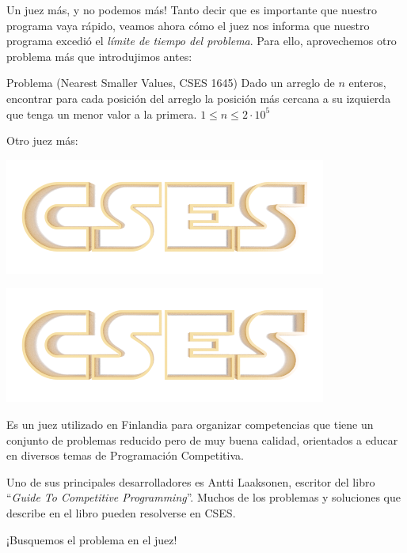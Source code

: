 \documentclass{beamer}
\begin{document}
    \begin{frame}{Un juez más, y no podemos más!}
        Tanto decir que es importante que nuestro programa vaya rápido, veamos ahora cómo el juez nos informa que nuestro programa excedió el \textit{límite de tiempo del problema}. Para ello, aprovechemos otro problema más que introdujimos antes: \pause

        \begin{block}{Problema (Nearest Smaller Values, CSES 1645)}
            Dado un arreglo de $n$ enteros, encontrar para cada posición del arreglo la posición más cercana a su izquierda que tenga un menor valor a la primera. $1 \leq n \leq 2 \cdot 10^5$
        \end{block} \pause

        Otro juez más:\pause
        \begin{center}
            \href{https://cses.fi/}{\includegraphics[width=.4\linewidth]{cses_logo.png}}
        \end{center} 
    \end{frame}

    \begin{frame}[noframenumbering]
        \begin{center}
            \href{https://cses.fi/}{\includegraphics[width=.4\linewidth]{cses_logo.png}}
        \end{center} \pause

        Es un juez utilizado en Finlandia para organizar competencias que tiene un conjunto de problemas reducido pero de muy buena calidad, orientados a educar en diversos temas de Programación Competitiva. \pause \vspace{4pt}

        Uno de sus principales desarrolladores es Antti Laaksonen, escritor del libro ``\textit{Guide To Competitive Programming}''. Muchos de los problemas y soluciones que describe en el libro pueden resolverse en CSES. \pause

        \begin{center}
            \LARGE
            ¡Busquemos el problema en el juez!
        \end{center}
    \end{frame}
\end{document}
